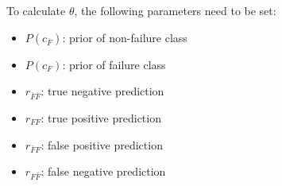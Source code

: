 \documentclass[12pt]{article} %
\begin{document}
To calculate $ \theta $, the following parameters need to be set:
\begin{itemize}
    \item $ P(c_{\bar{F}}) $: prior of non-failure class
    \item $ P(c_F) $: prior of failure class
    \item $ r_{\bar{F}\bar{F}} $: true negative prediction
    \item $ r_{FF} $: true positive prediction
    \item $ r_{\bar{F}F} $: false positive prediction
    \item $ r_{F\bar{F}} $: false negative prediction
\end{itemize}
\end{document}
